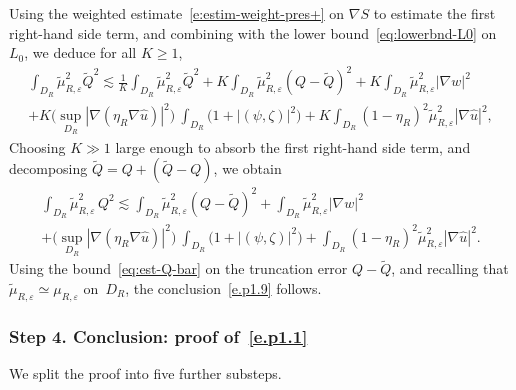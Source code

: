 \documentclass[10pt]{amsart}
\theoremstyle{plain}
\theoremstyle{definition}
\newcommand{\e}{\varepsilon}
\newcommand{\step}[1]{\subsubsection*{Step #1}}
\begin{document}
Using the weighted estimate~\eqref{e:estim-weight-pres+} on $\nabla S$ to estimate the first right-hand side term, and combining with the lower bound~\eqref{eq:lowerbnd-L0} on $L_0$, we deduce for all $K\ge1$,
\begin{multline*}
\int_{D_R}\tilde\mu_{R,\e}^2\tilde Q^2
\lesssim \frac1K\int_{D_R}\tilde\mu_{R,\e}^{2}\tilde Q^2
+K\int_{D_R}\tilde\mu_{R,\e}^2(Q-\tilde Q)^2
+K\int_{D_R}\tilde\mu_{R,\e}^2|\nabla w|^2\\
+K\Big(\sup_{D_R}|\nabla(\eta_R\nabla\hat u)|^2\Big)~\int_{D_R}\big(1+|(\psi,\zeta)|^2\big)
+K\int_{D_R}(1-\eta_R)^2\tilde\mu_{R,\e}^2|\nabla\hat u|^2,
\end{multline*}
Choosing $K\gg1$ large enough to absorb the first right-hand side term, and decomposing $\tilde Q=Q+(\tilde Q-Q)$, we obtain
\begin{multline*}
\int_{D_R}\tilde\mu_{R,\e}^2\, Q^2
\lesssim 
\int_{D_R}\tilde\mu_{R,\e}^2(Q-\tilde Q)^2
+\int_{D_R}\tilde\mu_{R,\e}^2|\nabla w|^2\\
+\Big(\sup_{D_R}|\nabla(\eta_R\nabla\hat u)|^2\Big)~\int_{D_R}\big(1+|(\psi,\zeta)|^2\big)
+\int_{D_R}(1-\eta_R)^2\tilde\mu_{R,\e}^2|\nabla\hat u|^2.
\end{multline*}
Using the bound~\eqref{eq:est-Q-bar} on the truncation error $Q-\tilde Q$, and recalling that $\tilde\mu_{R,\e}\simeq\mu_{R,\e}$ on~$D_R$, the conclusion~\eqref{e.p1.9} follows.

\step{4. Conclusion: proof of~\eqref{e.p1.1}}
We split the proof into five further substeps.
\end{document}
